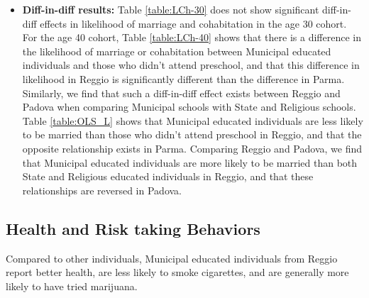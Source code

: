 \documentclass[11pt]{article}
\begin{document}
\begin{itemize}
\begin{itemize}
	\item \textbf{Diff-in-diff results:} Table \ref{table:LCh-30} does not show significant diff-in-diff effects in likelihood of marriage and cohabitation in the age 30 cohort. For the age 40 cohort, Table \ref{table:LCh-40} shows that there is a difference in the likelihood of marriage or cohabitation between Municipal educated individuals and those who didn't attend preschool, and that this difference in likelihood in Reggio is significantly different than the difference in Parma. Similarly, we find that such a diff-in-diff effect exists between Reggio and Padova when comparing Municipal schools with State and Religious schools. Table \ref{table:OLS_L} shows that Municipal educated individuals are less likely to be married than those who didn't attend preschool in Reggio, and that the opposite relationship exists in Parma. Comparing Reggio and Padova, we find that Municipal educated individuals are more likely to be married than both State and Religious educated individuals in Reggio, and that these relationships are reversed in Padova.
	\end{itemize}	
\end{itemize}  

\subsection{Health and Risk taking Behaviors}
Compared to other individuals, Municipal educated individuals from Reggio report better health, are less likely to smoke cigarettes, and are generally more likely to have tried marijuana.
\end{document}
